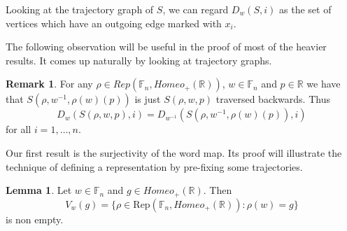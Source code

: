\documentclass[12pt]{article}
\newcommand{\F}{\mathbb{F}}
\newcommand{\R}{\mathbb{R}}
\theoremstyle{definition}
\newtheorem{lem}[thm]{Lemma}
\newtheorem{rem}[thm]{Remark}
\begin{document}
Looking at the trajectory graph of $S$, we can regard $D_w(S,i)$ as the set of vertices which have an outgoing edge marked with $x_i$.   

The following observation will be useful in the proof of most of the heavier results. It comes up naturally by looking at trajectory graphs.

\begin{rem}\label{inverso} For any $\rho\in Rep(\F_n,Homeo_{+}(\R))$, $w\in\F_n$ and $p\in\R$ we have that $S(\rho,w^{-1},\rho(w)(p))$ is just $S(\rho,w,p)$ traversed backwards. Thus $$D_w(S(\rho,w,p),i)=D_{w^{-1}}(S(\rho,w^{-1},\rho(w)(p)),i)$$ for all $i=1,\ldots,n$.
\end{rem}
 
Our first result is the surjectivity of the word map. Its proof will illustrate the technique of defining a representation by pre-fixing some trajectories.


\begin{lem}\label{tronco2} Let $w\in\F_n$ and $g\in Homeo_{+}(\R)$. Then  $$V_{w}(g) = \{\rho\in\text{Rep}(\F_n,Homeo_{+}(\R)): \rho(w)=g \}$$ is non empty.
\end{lem}
\end{document}
